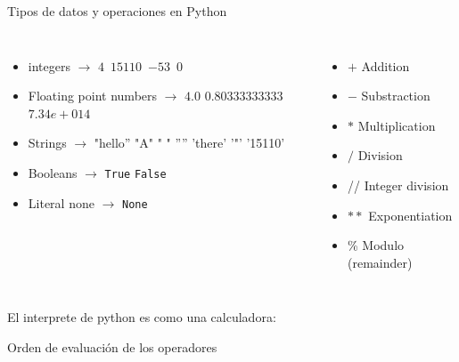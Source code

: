 \documentclass[
10pt,
aspectratio=169,
]{beamer}
\begin{document}
\begin{frame}[c]{Tipos de datos y operaciones en Python}
\begin{columns}
\begin{itemize}
\item integers $\rightarrow$ $4$\ $15110$\ $-53$\ $0$
\item Floating point numbers $\rightarrow$ $4.0$ $0.80333333333$ $7.34e+014$
\item Strings  $\rightarrow$ "hello” "A" " " ”” 'there' '"' '15110'
\item Booleans $\rightarrow$ \texttt{True} \texttt{False}
\item Literal none $\rightarrow$ \texttt{None}
\end{itemize}
\begin{itemize}
\item $+$ Addition 
\item $-$ Substraction 
\item $*$ Multiplication
\item $/$ Division
\item // Integer division
\item $**$ Exponentiation
\item \% Modulo (remainder)
\end{itemize}
\end{columns}
El interprete de python es como una calculadora:
\begin{minipage}[t]{\linewidth}
\end{minipage}
Orden de evaluaci\'on de los operadores
\begin{minipage}[t]{\linewidth}
\end{minipage}
\end{frame}
\end{document}
